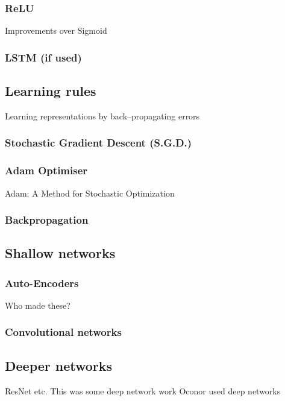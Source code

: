 \subsubsection{ReLU}
Improvements over Sigmoid

\subsubsection{LSTM (if used)}


\pagebreak
\subsection{Learning rules}
Learning representations by back--propagating errors\cite{Rumelhart1986}

\subsubsection{Stochastic Gradient Descent (S.G.D.)}

\subsubsection{Adam Optimiser}
Adam: A Method for Stochastic Optimization \cite{kingma2014adam}

\subsubsection{Backpropagation}

\pagebreak

\subsection{Shallow networks}  

\subsubsection{Auto-Encoders}  %
Who made these?

\subsubsection{Convolutional networks}

\pagebreak
\subsection{Deeper networks}   %
ResNet etc. %
This was some deep network work \cite{pedroni2013neuromorphic}
Oconor used deep networks \cite{OConnor2013}

